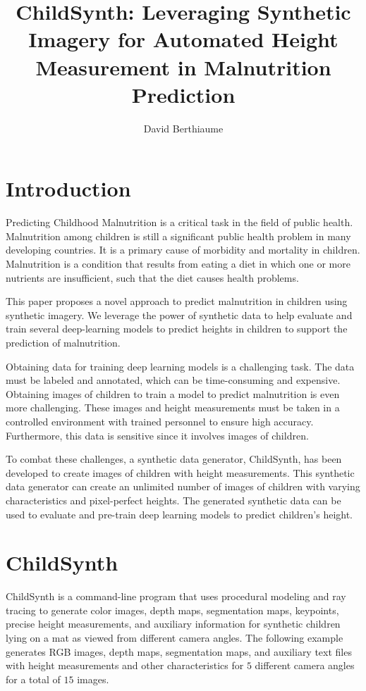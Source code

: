 \documentclass{article}
\title{ChildSynth: Leveraging Synthetic Imagery for Automated Height Measurement in Malnutrition Prediction}
\author{David Berthiaume}
\begin{document}
\maketitle



\section{Introduction}

Predicting Childhood Malnutrition is a critical task in the field of public health. Malnutrition among children is still a significant public health problem in many developing countries. It is a primary cause of morbidity and mortality in children. Malnutrition is a condition that results from eating a diet in which one or more nutrients are insufficient, such that the diet causes health problems.

This paper proposes a novel approach to predict malnutrition in children using synthetic imagery. 
We leverage the power of synthetic data to help evaluate and train several deep-learning models to predict heights in children to support the prediction of malnutrition. 

Obtaining data for training deep learning models is a challenging task. The data must be labeled and annotated, which can be time-consuming and expensive. Obtaining images of children to train a model to predict malnutrition is even more challenging. These images and height measurements must be taken in a controlled environment with trained personnel to ensure high accuracy. Furthermore, this data is sensitive since it involves images of children.

To combat these challenges, a synthetic data generator, ChildSynth, has been developed to create images of children with height measurements. This synthetic data generator can create an unlimited number of images of children with varying characteristics and pixel-perfect heights. The generated synthetic data can be used to evaluate and pre-train deep learning models to predict children's height. 

\section{ChildSynth}

ChildSynth is a command-line program that uses procedural modeling and ray tracing to generate color images, depth maps, segmentation maps, keypoints, precise height measurements, and auxiliary information for synthetic children lying on a mat as viewed from different camera angles. The following example generates RGB images, depth maps, segmentation maps, and auxiliary text files with height measurements and other characteristics for $5$ different camera angles for a total of $15$ images. 
\end{document}
